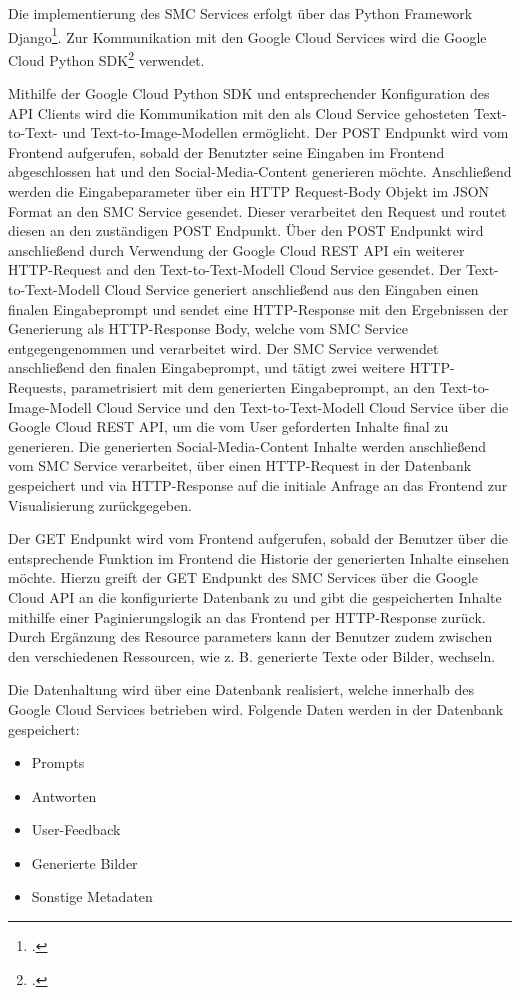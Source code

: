Die implementierung des \ac{SMC} Services erfolgt über das Python Framework Django\footcite{djangoproject}.
Zur Kommunikation mit den Google Cloud Services wird die Google Cloud Python SDK\footcite{googlecloudpython} verwendet.

Mithilfe der Google Cloud Python \ac{SDK} und entsprechender Konfiguration des API Clients wird die Kommunikation mit den als Cloud Service gehosteten Text-to-Text- und Text-to-Image-Modellen ermöglicht.
Der POST Endpunkt wird vom Frontend aufgerufen, sobald der Benutzter seine Eingaben im Frontend abgeschlossen hat und den Social-Media-Content generieren möchte.
Anschließend werden die Eingabeparameter über ein \ac{HTTP} Request-Body Objekt im \ac{JSON} Format an den \ac{SMC} Service gesendet.
Dieser verarbeitet den Request und routet diesen an den zuständigen POST Endpunkt.
Über den POST Endpunkt wird anschließend durch Verwendung der Google Cloud \ac{REST} \ac{API} ein weiterer \ac{HTTP}-Request and den Text-to-Text-Modell Cloud Service gesendet.
Der Text-to-Text-Modell Cloud Service generiert anschließend aus den Eingaben einen finalen Eingabeprompt und sendet eine \ac{HTTP}-Response mit den Ergebnissen der Generierung als HTTP-Response Body, welche vom \ac{SMC} Service entgegengenommen und verarbeitet wird.
Der \ac{SMC} Service verwendet anschließend den finalen Eingabeprompt, und tätigt zwei weitere \ac{HTTP}-Requests, parametrisiert mit dem generierten Eingabeprompt, an den Text-to-Image-Modell Cloud Service und den Text-to-Text-Modell Cloud Service über die Google Cloud \ac{REST} \ac{API}, um die vom User geforderten Inhalte final zu generieren.
Die generierten Social-Media-Content Inhalte werden anschließend vom \ac{SMC} Service verarbeitet, über einen \ac{HTTP}-Request in der Datenbank gespeichert und via \ac{HTTP}-Response auf die initiale Anfrage an das Frontend zur Visualisierung zurückgegeben.

Der GET Endpunkt wird vom Frontend aufgerufen, sobald der Benutzer über die entsprechende Funktion im Frontend die Historie der generierten Inhalte einsehen möchte.
Hierzu greift der GET Endpunkt des \ac{SMC} Services über die Google Cloud \ac{API} an die konfigurierte Datenbank zu und gibt die gespeicherten Inhalte mithilfe einer Paginierungslogik an das Frontend per \ac{HTTP}-Response zurück.
Durch Ergänzung des Resource parameters kann der Benutzer zudem zwischen den verschiedenen Ressourcen, wie z. B. generierte Texte oder Bilder, wechseln.

Die Datenhaltung wird über eine Datenbank realisiert, welche innerhalb des Google Cloud Services betrieben wird.
Folgende Daten werden in der Datenbank gespeichert:
\begin{itemize}
    \item Prompts
    \item Antworten
    \item User-Feedback
    \item Generierte Bilder
    \item Sonstige Metadaten
\end{itemize}


